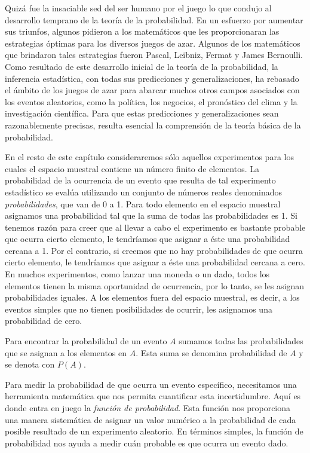 Quizá fue la insaciable sed del ser humano por el juego lo que condujo al desarrollo temprano de la teoría de la probabilidad. En un esfuerzo por aumentar sus triunfos, algunos pidieron a los matemáticos que les proporcionaran las estrategias óptimas para los diversos juegos de azar. Algunos de los matemáticos que brindaron tales estrategias fueron Pascal, Leibniz, Fermat y James Bernoulli. Como resultado de este desarrollo inicial de la teoría de la probabilidad, la inferencia estadística, con todas sus predicciones y generalizaciones, ha rebasado el ámbito de los juegos de azar para abarcar muchos otros campos asociados con los eventos aleatorios, como la política, los negocios, el pronóstico del clima y la investigación científica. Para que estas predicciones y generalizaciones sean razonablemente precisas, resulta esencial la comprensión de la teoría básica de la probabilidad.

En el resto de este capítulo consideraremos sólo aquellos experimentos para los cuales el espacio muestral contiene un número finito de elementos. La probabilidad de la ocurrencia de un evento que resulta de tal experimento estadístico se evalúa utilizando un conjunto de números reales denominados \emph{probabilidades}, que van de 0 a 1. Para todo elemento en el espacio muestral asignamos una probabilidad tal que la suma de todas las probabilidades es 1. Si tenemos razón para creer que al llevar a cabo el experimento es bastante probable que ocurra cierto elemento, le tendríamos que asignar a éste una probabilidad cercana a 1. Por el contrario, si creemos que no hay probabilidades de que ocurra cierto elemento, le tendríamos que asignar a éste una probabilidad cercana a cero. En muchos experimentos, como lanzar una moneda o un dado, todos los elementos tienen la misma oportunidad de ocurrencia, por lo tanto, se les asignan probabilidades iguales. A los elementos fuera del espacio muestral, es decir, a los eventos simples que no tienen posibilidades de ocurrir, les asignamos una probabilidad de cero.

Para encontrar la probabilidad de un evento $A$ sumamos todas las probabilidades que se asignan a los elementos en $A$. Esta suma se denomina probabilidad de $A$ y se denota con $P(A)$.

Para medir la probabilidad de que ocurra un evento específico, necesitamos una herramienta matemática que nos permita cuantificar esta incertidumbre. Aquí es donde entra en juego la \emph{función de probabilidad}. Esta función nos proporciona una manera sistemática de asignar un valor numérico a la probabilidad de cada posible resultado de un experimento aleatorio. En términos simples, la función de probabilidad nos ayuda a medir cuán probable es que ocurra un evento dado.

